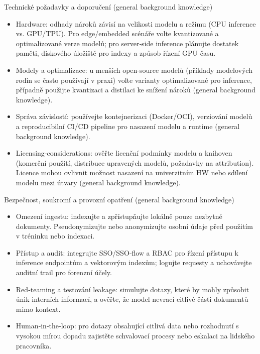 \documentclass{report}%
\begin{document}
Technické požadavky a doporučení (general background knowledge)
\begin{itemize}
  \item Hardware: odhady nároků závisí na velikosti modelu a režimu (CPU inference vs. GPU/TPU). Pro edge/embedded scénáře volte kvantizované a optimalizované verze modelů; pro server‑side inference plánujte dostatek paměti, diskového úložiště pro indexy a způsob řízení GPU času.
  \item Modely a optimalizace: u menších open‑source modelů (příklady modelových rodin se často používají v praxi) volte varianty optimalizované pro inference, případně použijte kvantizaci a distilaci ke snížení nároků (general background knowledge).
  \item Správa závislostí: používejte kontejnerizaci (Docker/OCI), verziování modelů a reproducibilní CI/CD pipeline pro nasazení modelu a runtime (general background knowledge).
  \item Licensing‑considerations: ověřte licenční podmínky modelu a knihoven (komerční použití, distribuce upravených modelů, požadavky na attribution). Licence mohou ovlivnit možnost nasazení na univerzitním HW nebo sdílení modelu mezi útvary (general background knowledge).
\end{itemize}

Bezpečnost, soukromí a provozní opatření (general background knowledge)
\begin{itemize}
  \item Omezení ingestu: indexujte a zpřístupňujte lokálně pouze nezbytné dokumenty. Pseudonymizujte nebo anonymizujte osobní údaje před použitím v tréninku nebo indexaci.
  \item Přístup a audit: integrujte SSO/SSO‑flow a RBAC pro řízení přístupu k inference endpointům a vektorovým indexům; logujte requesty a uchovávejte auditní trail pro forenzní účely.
  \item Red‑teaming a testování leakage: simulujte dotazy, které by mohly způsobit únik interních informací, a ověřte, že model nevrací citlivé části dokumentů mimo kontext.
  \item Human‑in‑the‑loop: pro dotazy obsahující citlivá data nebo rozhodnutí s vysokou mírou dopadu zajistěte schvalovací procesy nebo eskalaci na lidského pracovníka.
\end{itemize}
\end{document}
